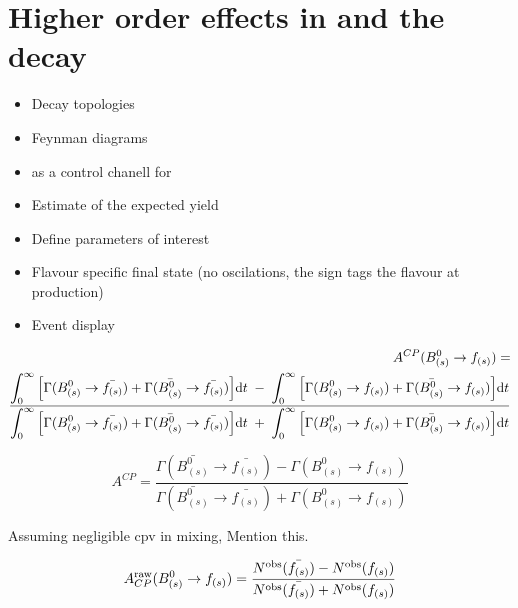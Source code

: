 \section{Higher order effects in \phis and the \BsJpsiKst decay}
\label{TheBsJpsiKstDecay}

\begin{itemize}
\item Decay topologies
\item Feynman diagrams
\item \BsJpsiKst as a control chanell for \phis
\item Estimate of the expected yield
\item Define parameters of interest
\item Flavour specific final state (no oscilations, the sign tags the flavour at production)
\item Event display
\end{itemize}



{\small
\begin{eqnarray}
A^{CP} (B^0_{(s)} \to f_{(s)})  = &  \nonumber \\
\frac{ \displaystyle \int_0^\infty \Big[ \Gamma(B^0_{(s)} \to \bar{f_{(s)}}) + \Gamma(\bar{B^0_{(s)}} \to \bar{f_{(s)}}) \Big]
{\rm d}t \;-\; \int_0^\infty \Big[ \Gamma(B^0_{(s)} \to f_{(s)}) + \Gamma(\bar{B^0_{(s)}} \to f_{(s)}) \Big]
{\rm d}t}{ \displaystyle \int_0^\infty \Big[ \Gamma(B^0_{(s)} \to \bar{f_{(s)}}) + \Gamma(\bar{B^0_{(s)}} \to \bar{f_{(s)}}) \Big] {\rm d}t
 \;+\; \int_0^\infty \Big[ \Gamma(B^0_{(s)} \to f_{(s)}) + \Gamma(\bar{B^0_{(s)}} \to f_{(s)}) \Big] {\rm d}t}  &
\label{decayrates}
\end{eqnarray}
 }

\begin{equation}
A^{CP} = \frac{\Gamma(\bar{B^0_{(s)}} \to \bar{f_{(s)}})-\Gamma(B^0_{(s)} \to f_{(s)})}{\Gamma(\bar{B^0_{(s)}} \to \bar{f_{(s)}})+ \Gamma(B^0_{(s)} \to f_{(s)})}
\end{equation}

{\color{red} Assuming negligible cpv in mixing, Mention this.}

\begin{equation}
A_{CP}^{\rm raw}(B^0_{(s)} \to f_{(s)}) = \frac{N^{\rm obs}(\bar{f_{(s)}}) -N^{\rm obs}(f_{(s)}) }{
N^{\rm obs}(\bar{f_{(s)}}) + N^{\rm obs}(f_{(s)})}
\label{acp_mes}
\end{equation}
